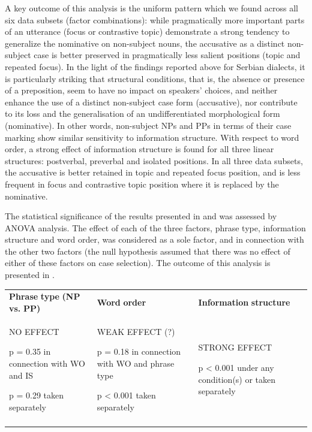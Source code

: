 \documentclass[output=paper]{langscibook}
\begin{document}
A key outcome of this analysis is the uniform pattern which we found across all six data subsets (factor combinations): while pragmatically more important parts of an utterance (focus or contrastive topic) demonstrate a strong tendency to generalize the nominative on non-subject nouns, the accusative as a distinct non-subject case is better preserved in pragmatically less salient positions (topic and repeated focus). In the light of the findings reported above for Serbian dialects, it is particularly striking that structural conditions, that is, the absence or presence of a preposition, seem to have no impact on speakers’ choices, and neither enhance the use of a distinct non-subject case form (accusative), nor contribute to its loss and the generalisation of an undifferentiated morphological form (nominative). In other words, non-subject NPs and PPs in terms of their case marking show similar sensitivity to information structure. With respect to word order, a strong effect of information structure is found for all three linear structures: postverbal, preverbal and isolated positions. In all three data subsets, the accusative is better retained in topic and repeated focus position, and is less frequent in focus and contrastive topic position where it is replaced by the nominative. 

The statistical significance of the results presented in  and  was assessed by ANOVA analysis. The effect of each of the three factors, phrase type, information structure and word order, was considered as a sole factor, and in connection with the other two factors (the null hypothesis assumed that there was no effect of either of these factors on case selection). The outcome of this analysis is presented in . 


\begin{tabularx}{\textwidth}{XXX}

\lsptoprule

\textbf{Phrase} \textbf{type} \textbf{(NP} \textbf{vs.} \textbf{PP)} & \textbf{Word} \textbf{order}  & \textbf{Information} \textbf{structure}\\
NO EFFECT

p = 0.35 in connection with WO and IS

p = 0.29 taken separately & WEAK EFFECT (?)

p = 0.18 in connection with WO and phrase type  

p < 0.001 taken separately & STRONG EFFECT

p < 0.001 under any condition(s) or taken separately\\
\lspbottomrule
\end{tabularx}
\begin{table}
\caption{The effect of phrase type, word order and information structure on case marking in Bulgarian border-region dialects}
\label{tab:key:4}
\end{table}
\end{document}
